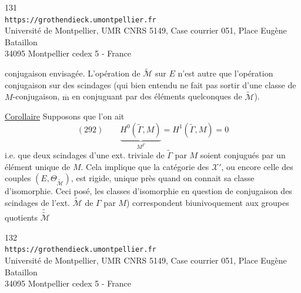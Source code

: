 
\begin{center}
\small
131\\
\texttt{https://grothendieck.umontpellier.fr}\\
Université de Montpellier, UMR CNRS 5149, Case courrier 051, Place Eugène Bataillon\\
34095 Montpellier cedex 5 - France
\end{center}

conjugaison envisagée. L'opération  de $\widetilde{\mathcal M}$ sur $E$  n'est autre que l'opération   conjugaison sur  des scindages (qui bien entendu ne fait pas sortir d'une classe de $M$-conjugaison, $\overline{\mathrm m}$ en conjuguant par des éléments quelconques de $\widetilde{\mathcal M}$).

\uline{Corollaire} Supposons que l'on ait
\[
(292)\qquad \underbrace{H^0(\widetilde\Gamma,M)}_{M^\Gamma}=H^1(\widetilde\Gamma,M)=0
\]
i.e. que  deux scindages d'une ext. triviale de $\widetilde\Gamma$ par $M$ soient conjugués par un élément unique de $M$. Cela implique  que la catégorie des $\mathcal X'$, ou encore celle des couples $(E,\Theta_{\widetilde{\mathcal M}})$, est rigide,   unique près quand on connait sa classe d'isomorphie. Ceci posé, les classes d'isomorphie en question  de  conjugaison des scindages de  l'ext. $\widetilde{\mathcal M}$ de $\Gamma$ par $M$) correspondent biunivoquement aux groupes quotients $\widetilde{\widetilde{\mathcal M}}$


\begin{center}
\small
132\\
\texttt{https://grothendieck.umontpellier.fr}\\
Université de Montpellier, UMR CNRS 5149, Case courrier 051, Place Eugène Bataillon\\
34095 Montpellier cedex 5 - France
\end{center}

